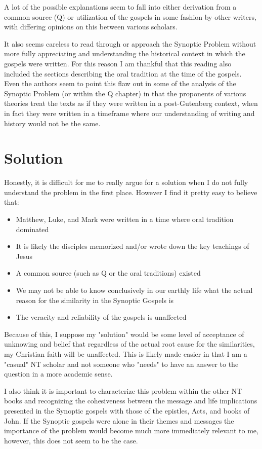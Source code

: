 \documentclass[12pt]{turabian-researchpaper}
\begin{document}
A lot of the possible explanations seem to fall into either derivation from a common source (Q) or utilization of the gospels in some fashion by other writers, with differing opinions on this between various scholars.

It also seems careless to read through or approach the Synoptic Problem without more fully appreciating and understanding the historical context in which the gospels were written. For this reason I am thankful that this reading also included the sections describing the oral tradition at the time of the gospels. Even the authors seem to point this flaw out in some of the analysis of the Synoptic Problem (or within the Q chapter) in that the proponents of various theories treat the texts as if they were written in a post-Gutenberg context, when in fact they were written in a timeframe where our understanding of writing and history would not be the same.


\section{Solution}

Honestly, it is difficult for me to really argue for a solution when I do not fully understand the problem in the first place. However I find it pretty easy to believe that:

\begin{itemize}
\item Matthew, Luke, and Mark were written in a time where oral tradition dominated
\item It is likely the disciples memorized and/or wrote down the key teachings of Jesus
\item A common source (such as Q or the oral traditions) existed
\item We may not be able to know conclusively in our earthly life what the actual reason for the similarity in the Synoptic Gospels is
\item The veracity and reliability of the gospels is unaffected
\end{itemize}

Because of this, I suppose my "solution" would be some level of acceptance of unknowing and belief that regardless of the actual root cause for the similarities, my Christian faith will be unaffected. This is likely made easier in that I am a "casual" NT scholar and not someone who "needs" to have an answer to the question in a more academic sense.

I also think it is important to characterize this problem within the other NT books and recognizing the cohesiveness between the message and life implications presented in the Synoptic gospels with those of the epistles, Acts, and books of John. If the Synoptic gospels were alone in their themes and messages the importance of the problem would become much more immediately relevant to me, however, this does not seem to be the case.

\newpage

\printbibliography
\end{document}
